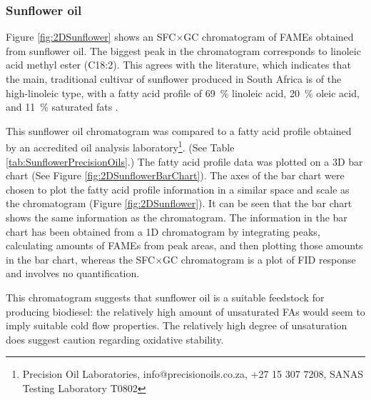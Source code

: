 \subsubsection{Sunflower oil}

Figure \ref{fig:2DSunflower} shows an SFC×GC chromatogram of FAMEs obtained from
sunflower oil. The biggest peak in the chromatogram corresponds to linoleic acid
methyl ester (C18:2). This agrees with the literature, which indicates that the
main, traditional cultivar of sunflower produced in South Africa is of the
high-linoleic type, with a fatty acid profile of \SI{69}{\percent} linoleic
acid, \SI{20}{\percent} oleic acid, and \SI{11}{\percent} saturated fats
\autocite {JFAOWHOCAC2019}.

This sunflower oil chromatogram was compared to a fatty acid profile obtained by
an accredited oil analysis laboratory\footnote{Precision Oil Laboratories,
info@precisionoils.co.za,  +27 15 307 7208, SANAS Testing Laboratory T0802}.
(See Table \ref{tab:SunflowerPrecisionOils}.) The fatty acid profile data was
plotted on a 3D bar chart (See Figure \ref{fig:2DSunflowerBarChart}). The axes
of the bar chart were chosen to plot the fatty acid profile information in a
similar space and scale as the chromatogram (Figure \ref{fig:2DSunflower}). It
can be seen that the bar chart shows the same information as the chromatogram.
The information in the bar chart has been obtained from a 1D chromatogram by
integrating peaks, calculating amounts of FAMEs from peak areas, and then
plotting those amounts in the bar chart, whereas the SFC×GC chromatogram is a
plot of FID response and involves no quantification.

This chromatogram suggests that sunflower oil is a suitable feedstock for
producing biodiesel: the relatively high amount of unsaturated FAs would seem to
imply suitable cold flow properties. The relatively high degree of unsaturation
does suggest caution regarding oxidative stability.

